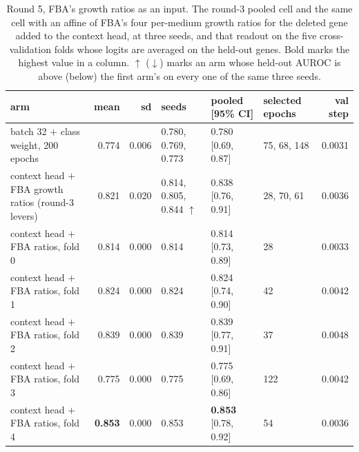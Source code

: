\begin{table}[H]
  \centering
  \footnotesize
  \caption[Round 5, FBA's growth ratios as an input]{Round 5, FBA's growth ratios as an input. The round-3 pooled cell and the same cell with an affine of FBA's four per-medium growth ratios for the deleted gene added to the context head, at three seeds, and that readout on the five cross-validation folds whose logits are averaged on the held-out genes. Bold marks the highest value in a column. $\uparrow$ ($\downarrow$) marks an arm whose held-out AUROC is above (below) the first arm's on every one of the same three seeds.}
  \label{tab:w16}
  \begin{tabular}{@{}p{52mm}rrlllr@{}}
    \hline
    arm & mean & sd & seeds & pooled [95\% CI] & selected epochs & val step \\
    \hline
    batch 32 $+$ class weight, 200 epochs & 0.774 & 0.006 & 0.780, 0.769, 0.773 & 0.780 [0.69, 0.87] & 75, 68, 148 & 0.0031 \\
    context head $+$ FBA growth ratios (round-3 levers) & 0.821 & 0.020 & 0.814, 0.805, 0.844 $\uparrow$ & 0.838 [0.76, 0.91] & 28, 70, 61 & 0.0036 \\
    context head $+$ FBA ratios, fold 0 & 0.814 & 0.000 & 0.814 & 0.814 [0.73, 0.89] & 28 & 0.0033 \\
    context head $+$ FBA ratios, fold 1 & 0.824 & 0.000 & 0.824 & 0.824 [0.74, 0.90] & 42 & 0.0042 \\
    context head $+$ FBA ratios, fold 2 & 0.839 & 0.000 & 0.839 & 0.839 [0.77, 0.91] & 37 & 0.0048 \\
    context head $+$ FBA ratios, fold 3 & 0.775 & 0.000 & 0.775 & 0.775 [0.69, 0.86] & 122 & 0.0042 \\
    context head $+$ FBA ratios, fold 4 & \textbf{0.853} & 0.000 & 0.853 & \textbf{0.853} [0.78, 0.92] & 54 & 0.0036 \\
    \hline
  \end{tabular}
\end{table}
